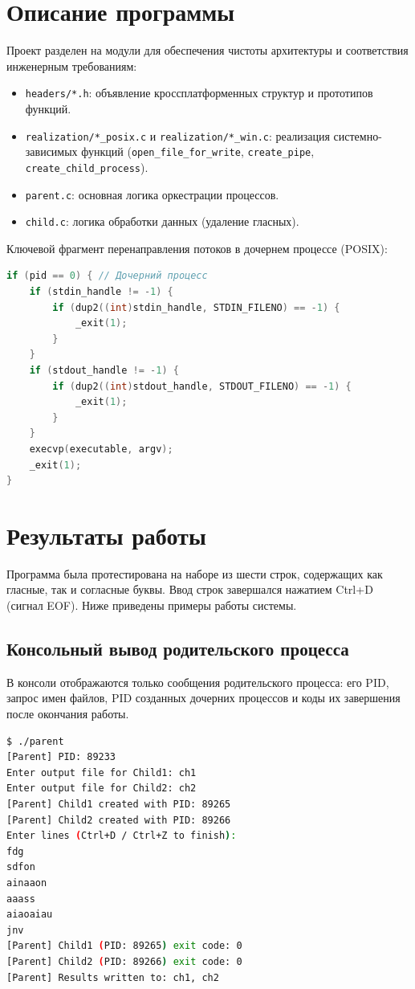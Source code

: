 \documentclass[pdf, unicode, 12pt, a4paper, oneside, fleqn]{article}
\begin{document}
\section{Описание программы}
Проект разделен на модули для обеспечения чистоты архитектуры и соответствия инженерным требованиям:
\begin{itemize}
    \item \texttt{headers/*.h}: объявление кроссплатформенных структур и прототипов функций.
    \item \texttt{realization/*\_posix.c} и \texttt{realization/*\_win.c}: реализация системно-зависимых функций (\texttt{open\_file\_for\_write}, \texttt{create\_pipe}, \texttt{create\_child\_process}).
    \item \texttt{parent.c}: основная логика оркестрации процессов.
    \item \texttt{child.c}: логика обработки данных (удаление гласных).
\end{itemize}

Ключевой фрагмент перенаправления потоков в дочернем процессе (POSIX):
\begin{lstlisting}[language=C]
if (pid == 0) { // Дочерний процесс
    if (stdin_handle != -1) {
        if (dup2((int)stdin_handle, STDIN_FILENO) == -1) {
            _exit(1);
        }
    }
    if (stdout_handle != -1) {
        if (dup2((int)stdout_handle, STDOUT_FILENO) == -1) {
            _exit(1);
        }
    }
    execvp(executable, argv);
    _exit(1);
}
\end{lstlisting}

\pagebreak


\section{Результаты работы}

Программа была протестирована на наборе из шести строк, содержащих как гласные, так и согласные буквы. Ввод строк завершался нажатием Ctrl+D (сигнал EOF). Ниже приведены примеры работы системы.

\subsection*{Консольный вывод родительского процесса}
В консоли отображаются только сообщения родительского процесса: его PID, запрос имен файлов, PID созданных дочерних процессов и коды их завершения после окончания работы.

\begin{lstlisting}[language=bash, caption=Вывод в консоль родительского процесса]
$ ./parent
[Parent] PID: 89233
Enter output file for Child1: ch1
Enter output file for Child2: ch2
[Parent] Child1 created with PID: 89265
[Parent] Child2 created with PID: 89266
Enter lines (Ctrl+D / Ctrl+Z to finish):
fdg
sdfon
ainaaon
aaass
aiaoaiau
jnv
[Parent] Child1 (PID: 89265) exit code: 0
[Parent] Child2 (PID: 89266) exit code: 0
[Parent] Results written to: ch1, ch2
\end{lstlisting}
\end{document}
